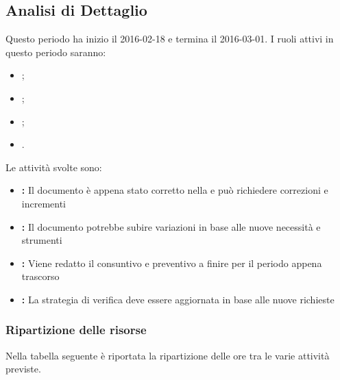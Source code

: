 \documentclass[12pt,a4paper]{article}
\begin{document}
\newpage

\subsection{Analisi di Dettaglio}
Questo periodo ha inizio il 2016-02-18 e termina il 2016-03-01. I ruoli attivi in questo periodo saranno:

\begin{itemize}
	\item \AM{};
	\item \AN{};
	\item \RE{};
	\item \VR{}.
\end{itemize}

Le attività svolte sono:

\begin{itemize}
	\item \textbf{\AdR{}:} 
	Il documento è appena stato corretto nella \RR{} e può richiedere correzioni e incrementi
	\item \textbf{\NdP{}:}
	Il documento potrebbe subire variazioni in base alle nuove necessità e strumenti
	\item \textbf{\PdP{}:} Viene redatto il consuntivo e preventivo a finire per il periodo appena trascorso
	\item \textbf{\PdQ{}:}
		La strategia di verifica deve essere aggiornata in base alle nuove richieste
\end{itemize}

\subsubsection{Ripartizione delle risorse}
Nella tabella seguente è riportata la ripartizione delle ore tra le varie attività previste.
\end{document}
